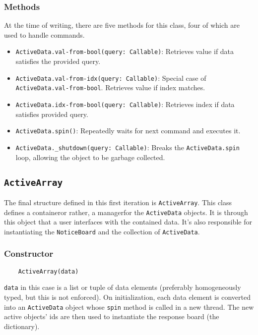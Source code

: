 \documentclass[10pt]{article}
\begin{document}
	\subsubsection{Methods}
		At the time of writing, there are five methods for this class, four of which are used to handle commands.
		\begin{itemize}
			\item \lstinline|ActiveData.val-from-bool(query: Callable)|: Retrieves value if data satisfies the provided query.
			
			\item \lstinline|ActiveData.val-from-idx(query: Callable)|: Special case of\\ \lstinline|ActiveData.val-from-bool|. Retrieves value if index matches. 
			
			\item \lstinline|ActiveData.idx-from-bool(query: Callable)|: Retrieves index if data satisfies provided query.
			
			\item \lstinline|ActiveData.spin()|: Repeatedly waits for next command and executes it.
			
			\item \lstinline|ActiveData._shutdown(query: Callable)|: Breaks the \lstinline|ActiveData.spin| loop, allowing the object to be garbage collected.
		\end{itemize}
\subsection{\lstinline|ActiveArray|}
	The final structure defined in this first iteration is \lstinline|ActiveArray|. This class defines a container\textemdash or rather, a manager\textemdash for the \lstinline|ActiveData| objects. It is through this object that a user interfaces with the contained data. It's also responsible for instantiating the \lstinline|NoticeBoard| and the collection of \lstinline|ActiveData|.
	
	\subsubsection{Constructor}
	\begin{lstlisting}
	ActiveArray(data)
	\end{lstlisting}
	\lstinline|data| in this case is a list or tuple of data elements (preferably homogeneously typed, but this is not enforced). On initialization, each data element is converted into an \lstinline|ActiveData| object whose \lstinline|spin| method is called in a new thread. The new active objects' ids are then used to instantiate the response board (the dictionary). 
	
\end{document}

